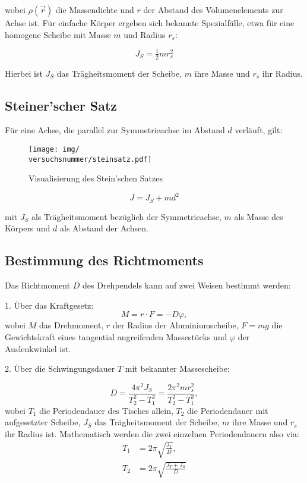 wobei $\rho(\vec{r})$ die Massendichte und $r$ der Abstand des Volumenelements zur Achse ist.  
Für einfache Körper ergeben sich bekannte Spezialfälle, etwa für eine homogene Scheibe mit Masse $m$ und Radius $r_s$:

\begin{equation}
    J_S = \tfrac{1}{2} m r_s^2
\end{equation}

Hierbei ist $J_S$ das Trägheitsmoment der Scheibe, $m$ ihre Masse und $r_s$ ihr Radius.

\subsection*{Steiner’scher Satz}
Für eine Achse, die parallel zur Symmetrieachse im Abstand $d$ verläuft, gilt:

\begin{figure}[h!]
    \centering
    \texttt{[image: img/\\versuchsnummer/steinsatz.pdf]}
    \caption{Visualisierung des Stein'schen Satzes}
    \label{fig:steinscher_satz}
\end{figure}

\begin{equation}
    J = J_S + md^2
    \label{eq:steinsatz}
\end{equation}

mit $J_S$ als Trägheitsmoment bezüglich der Symmetrieachse, $m$ als Masse des Körpers und $d$ als Abstand der Achsen.
\subsection*{Bestimmung des Richtmoments}
Das Richtmoment $D$ des Drehpendels kann auf zwei Weisen bestimmt werden:

1. Über das Kraftgesetz:
\begin{equation}
    M = r \cdot F = -D\varphi,
\end{equation}
wobei $M$ das Drehmoment, $r$ der Radius der Aluminiumscheibe, $F = mg$ die Gewichtskraft eines tangential angreifenden Massestücks und $\varphi$ der Auslenkwinkel ist.

2. Über die Schwingungsdauer $T$ mit bekannter Massescheibe:

\begin{equation}
    D = \frac{4\pi^2 J_S}{T_2^2 - T_1^2} = \frac{2\pi^2 m r_s^2}{T_2^2 - T_1^2},
    \label{eq:richtmoment_rechnen}
\end{equation}
wobei $T_1$ die Periodendauer des Tisches allein, $T_2$ die Periodendauer mit aufgesetzter Scheibe, $J_S$ das Trägheitsmoment der Scheibe, $m$ ihre Masse und $r_s$ ihr Radius ist. 
Mathematisch werden die zwei einzelnen Periodendauern also via:
\begin{align}
    T_1 &= 2\pi \sqrt{\frac{J_T}{D}}, \\
    T_2 &= 2\pi \sqrt{\frac{J_T+J_S}{D}}
    \label{eq:T_def}
\end{align}

